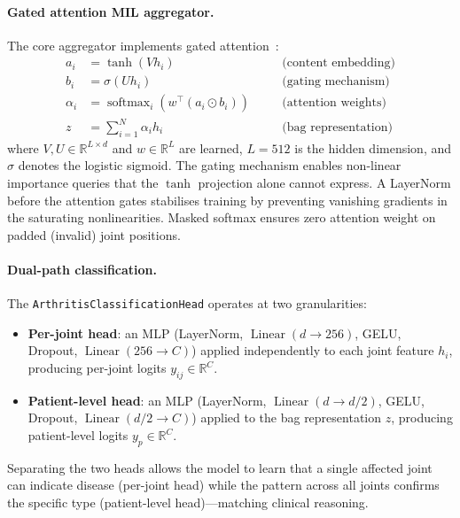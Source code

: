 \documentclass{article}
\begin{document}
\paragraph{Gated attention MIL aggregator.} The core aggregator implements gated attention~\cite{ilse2018}:
\begin{align}
a_i &= \tanh(V h_i) \quad &&\text{(content embedding)} \label{eq:tanh}\\
b_i &= \sigma(U h_i) \quad &&\text{(gating mechanism)} \label{eq:gate}\\
\alpha_i &= \operatorname{softmax}_i\left(w^\top (a_i \odot b_i)\right) \quad &&\text{(attention weights)} \label{eq:attn}\\
z &= \sum_{i=1}^{N} \alpha_i h_i \quad &&\text{(bag representation)} \label{eq:bag}
\end{align}
where $V,U \in \mathbb{R}^{L \times d}$ and $w \in \mathbb{R}^{L}$ are learned, $L=512$ is the hidden dimension, and $\sigma$ denotes the logistic sigmoid. The gating mechanism enables non-linear importance queries that the $\tanh$ projection alone cannot express. A LayerNorm before the attention gates stabilises training by preventing vanishing gradients in the saturating nonlinearities. Masked softmax ensures zero attention weight on padded (invalid) joint positions.

\paragraph{Dual-path classification.} The \texttt{ArthritisClassificationHead} operates at two granularities:
\begin{itemize}
  \item \textbf{Per-joint head}: an MLP (LayerNorm, $\operatorname{Linear}(d \to 256)$, GELU, Dropout, $\operatorname{Linear}(256 \to C)$) applied independently to each joint feature $h_i$, producing per-joint logits $y_{ij} \in \mathbb{R}^C$.
  \item \textbf{Patient-level head}: an MLP (LayerNorm, $\operatorname{Linear}(d \to d/2)$, GELU, Dropout, $\operatorname{Linear}(d/2 \to C)$) applied to the bag representation $z$, producing patient-level logits $y_p \in \mathbb{R}^C$.
\end{itemize}
Separating the two heads allows the model to learn that a single affected joint can indicate disease (per-joint head) while the pattern across all joints confirms the specific type (patient-level head)---matching clinical reasoning.
\end{document}
